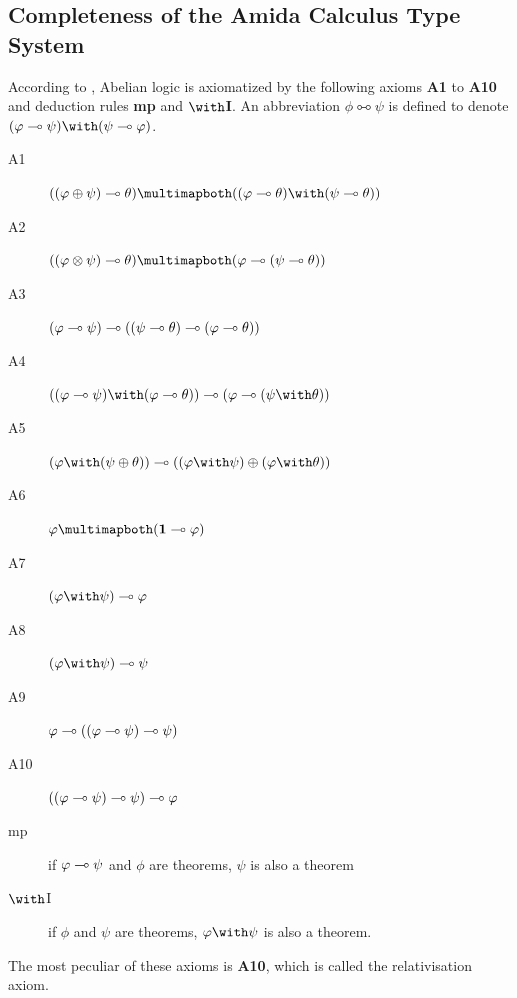 \subsection{Completeness of the Amida Calculus Type System}

According to \citet{metcalfe2002}, Abelian logic is axiomatized by the
following axioms \textbf{A1} to \textbf{A10} and deduction rules
\textbf{mp} and $\with$\textbf{I}.  An abbreviation $\phi
\multimapboth \psi$ is defined to denote $(\phi\limp \psi)\with
(\psi\limp\phi)$.
\begin{description}
 \item[A1] $((\phi\oplus\psi)\limp\theta)\multimapboth
      ((\phi\limp\theta)\with(\psi\limp\theta))$
 \item[A2]
      $((\phi\otimes\psi)\limp\theta)\multimapboth(\phi\limp(\psi\limp\theta))$
 \item[A3]
      $(\varphi\multimap\psi)\multimap((\psi\multimap\theta)\multimap(\varphi\multimap\theta))$
 \item[A4]
      $((\phi\limp\psi)\with(\phi\limp\theta))\limp(\phi\limp(\psi\with\theta))$
 \item[A5]
      $(\phi\with(\psi\oplus\theta))\limp ((\phi\with\psi)\oplus
      (\phi\with\theta))$
 \item[A6]
      $\phi\multimapboth (\one\limp\phi)$
 \item[A7]
      $(\phi\with\psi)\limp\phi$
 \item[A8]
      $(\phi\with\psi)\limp\psi$
 \item[A9]
      $\varphi\multimap((\varphi\multimap\psi)\multimap\psi)$
 \item[A10]
      $((\varphi\multimap\psi)\multimap\psi)\multimap\varphi$
 \item[mp]
      if $\varphi\multimap\psi$ and $\phi$ are theorems, $\psi$ is also a
      theorem
 \item[$\with$I] if $\phi$ and $\psi$ are theorems, $\phi\with\psi$ is
      also a theorem.
\end{description}
The most peculiar of these axioms is \textbf{A10}, which is called the
relativisation axiom.

